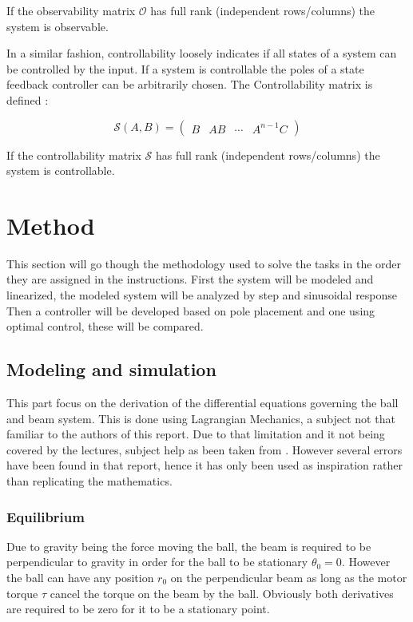 \documentclass[a4paper, titlepage]{article}
\begin{document}
If the observability matrix $\mathcal{O}$ has full rank (independent rows/columns) the system is observable.

In a similar fashion, controllability loosely indicates if all states of a system can be controlled by the input. If a system is controllable the poles of a state feedback controller can be arbitrarily chosen.
The Controllability matrix is defined \citep[p.~45]{glad00}:

\begin{equation}
\mathcal{S}(A,B) = 
\begin{pmatrix}
B & AB & \cdots & A^{n-1}C
\end{pmatrix}
\label{equ:ctrb}
\end{equation}

If the controllability matrix $\mathcal{S}$ has full rank (independent rows/columns) the system is controllable.

\section{Method}
This section will go though the methodology used to solve the tasks in the order they are assigned in the instructions.
First the system will be modeled and linearized, the modeled system will be analyzed by step and sinusoidal response
Then a controller will be developed based on pole placement and one using optimal control, these will be compared.

\subsection{Modeling and simulation}
This part focus on the derivation of the differential equations governing the ball and beam system.
This is done using Lagrangian Mechanics, a subject not that familiar to the authors of this report.
Due to that limitation and it not being covered by the lectures, subject help as been taken from \citep{BolvarVincenty2014ModellingTB}.
However several errors have been found in that report, hence it has only been used as inspiration rather than replicating the mathematics.

\subsubsection{Equilibrium}
Due to gravity being the force moving the ball, the beam is required to be perpendicular to gravity in order for the ball to be stationary $\theta_0 = 0$.
However the ball can have any position $r_0$ on the perpendicular beam as long as the motor torque $\tau$ cancel the torque on the beam by the ball.
Obviously both derivatives are required to be zero for it to be a stationary point.
\end{document}
